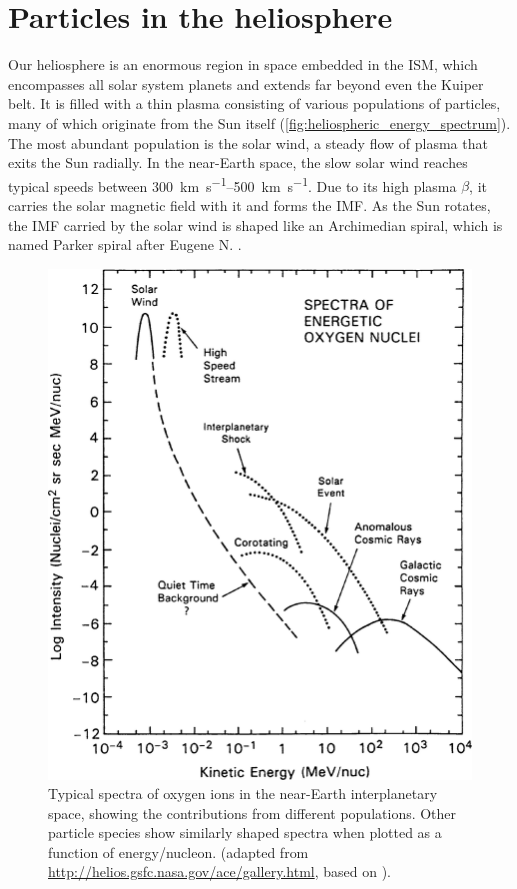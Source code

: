\section{Particles in the heliosphere}

Our heliosphere is an enormous region in space embedded in the \ac{ISM}, which encompasses all solar system planets and extends far beyond even the Kuiper belt. 
It is filled with a thin plasma consisting of various populations of particles, many of which originate from the Sun itself (\autoref{fig:heliospheric_energy_spectrum}). 
The most abundant population is the solar wind, a steady flow of plasma that exits the Sun radially. 
In the near-Earth space, the slow solar wind reaches typical speeds between \SIrange[range-phrase={\,and\,}]{300}{500}{\kilo\meter\per\second}.
Due to its high plasma $\beta$, it carries the solar magnetic field with it and forms the \ac{IMF}.
As the Sun rotates, the \ac{IMF} carried by the solar wind is shaped like an Archimedian spiral, which is named Parker spiral after Eugene N. \citet{Parker-1958}.

\begin{figure}
    \centering
    \includegraphics[width=0.6\linewidth]{images/heliospheric_energy_spectrum}
    \caption[Spectra of oxygen ions in the near-Earth interplanetary space]{Typical spectra of oxygen ions in the near-Earth interplanetary space, showing the contributions from different populations. Other particle species show similarly shaped spectra when plotted as a function of energy/nucleon. (adapted from \url{http://helios.gsfc.nasa.gov/ace/gallery.html}, based on \citet{Mewaldt-2001}).}
    \label{fig:heliospheric_energy_spectrum}
\end{figure}

